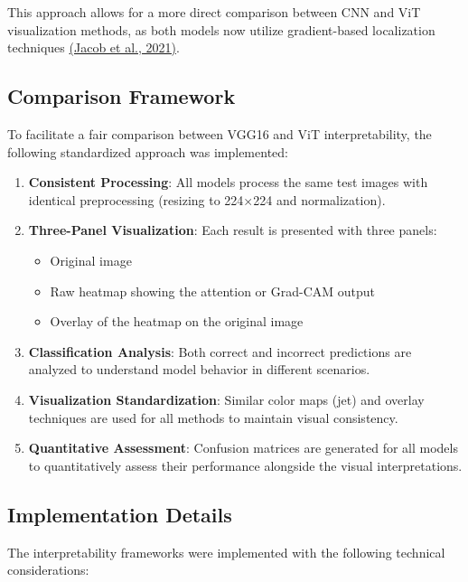 \documentclass[a4paper,12pt]{article}
\begin{document}
This approach allows for a more direct comparison between CNN and ViT visualization methods, as both models now utilize gradient-based localization techniques \href{https://arxiv.org/abs/2112.00114}{(Jacob et al., 2021)}.

\subsection{Comparison Framework}

To facilitate a fair comparison between VGG16 and ViT interpretability, the following standardized approach was implemented:

\begin{enumerate}
    \item \textbf{Consistent Processing}: All models process the same test images with identical preprocessing (resizing to 224×224 and normalization).
    
    \item \textbf{Three-Panel Visualization}: Each result is presented with three panels:
    \begin{itemize}
        \item Original image
        \item Raw heatmap showing the attention or Grad-CAM output
        \item Overlay of the heatmap on the original image
    \end{itemize}
    
    \item \textbf{Classification Analysis}: Both correct and incorrect predictions are analyzed to understand model behavior in different scenarios.
    
    \item \textbf{Visualization Standardization}: Similar color maps (jet) and overlay techniques are used for all methods to maintain visual consistency.
    
    \item \textbf{Quantitative Assessment}: Confusion matrices are generated for all models to quantitatively assess their performance alongside the visual interpretations.
\end{enumerate}

\subsection{Implementation Details}

The interpretability frameworks were implemented with the following technical considerations:
\end{document}

